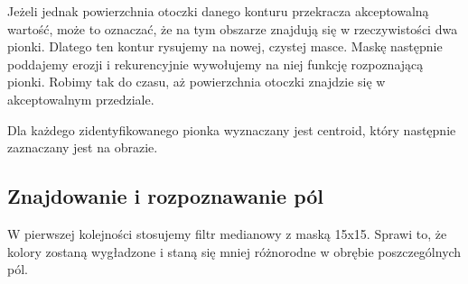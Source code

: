 \documentclass[a4paper]{article}
\begin{document}
    Jeżeli jednak powierzchnia otoczki danego konturu przekracza akceptowalną wartość, może to oznaczać, że na tym obszarze znajdują się w rzeczywistości dwa pionki. Dlatego ten kontur rysujemy na nowej, czystej masce. Maskę następnie poddajemy erozji i rekurencyjnie wywołujemy na niej funkcję rozpoznającą pionki. Robimy tak do czasu, aż powierzchnia otoczki znajdzie się w akceptowalnym przedziale.

    Dla każdego zidentyfikowanego pionka wyznaczany jest centroid, który następnie zaznaczany jest na obrazie.

    \subsection{Znajdowanie i rozpoznawanie pól}
    W pierwszej kolejności stosujemy filtr medianowy z maską 15x15. Sprawi to, że kolory zostaną wygładzone i staną się mniej różnorodne w obrębie poszczególnych pól.
    
\end{document}
